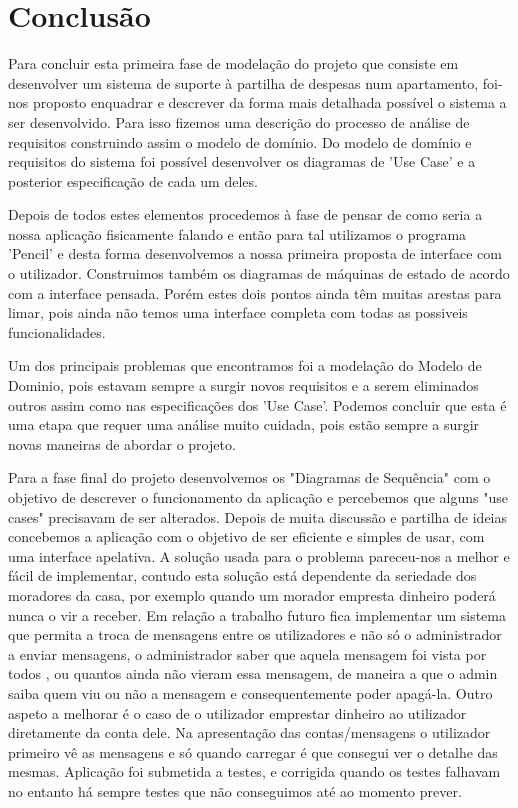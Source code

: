 \chapter{Conclusão}

Para concluir esta primeira fase de modelação do projeto que consiste em  desenvolver um sistema de suporte à partilha de despesas num apartamento, foi-nos proposto enquadrar e descrever da forma mais detalhada possível o sistema a ser desenvolvido. Para isso fizemos uma descrição do processo de análise de requisitos construindo assim o modelo de domínio.  Do modelo de domínio e requisitos do sistema foi possível desenvolver os diagramas de 'Use Case' e a posterior especificação de cada um deles. 

Depois de todos estes elementos procedemos à fase de pensar de como seria a nossa aplicação fisicamente falando e então para tal utilizamos o programa 'Pencil' e desta forma desenvolvemos a nossa primeira proposta de interface com o utilizador. Construimos também os diagramas de máquinas de estado de acordo com a interface pensada. Porém estes dois pontos ainda têm muitas arestas para limar, pois ainda não temos uma interface completa com todas as possiveis funcionalidades. 

Um dos principais problemas que encontramos foi a modelação do Modelo de Dominio, pois estavam sempre a surgir novos requisitos e a serem eliminados outros assim como nas especificações dos 'Use Case'. Podemos concluir que esta é uma etapa que requer uma análise muito cuidada, pois estão sempre a surgir novas maneiras de abordar o projeto. 


Para a fase final do projeto desenvolvemos os "Diagramas de Sequência" com o objetivo de descrever o funcionamento da aplicação e percebemos que alguns "use cases" precisavam de ser alterados.  Depois de muita discussão e partilha de ideias concebemos a aplicação com o objetivo de ser eficiente e simples de usar, com uma interface apelativa. 
A solução usada para o problema pareceu-nos a melhor e fácil de implementar, contudo esta solução está dependente da seriedade dos moradores da casa, por exemplo quando um morador empresta dinheiro poderá nunca o vir a receber. 
Em relação a trabalho futuro fica implementar um sistema que permita a troca de mensagens entre os utilizadores e não só o administrador a enviar mensagens, o administrador saber que aquela mensagem foi vista por todos , ou quantos ainda não vieram essa mensagem, de maneira a que o admin saiba quem viu ou não a mensagem e consequentemente poder apagá-la. 
Outro aspeto a melhorar é o caso de o utilizador emprestar dinheiro ao utilizador diretamente da conta dele. 
Na apresentação das contas/mensagens o utilizador primeiro vê as mensagens e só quando carregar é que consegui ver o detalhe das mesmas. 
Aplicação foi submetida a testes, e  corrigida quando os testes falhavam no entanto há sempre testes que não conseguimos até ao momento prever. 




